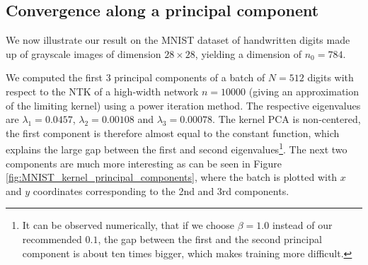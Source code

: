 \documentclass{article}
\begin{document}
\subsection{Convergence along a principal component}
We now illustrate our result on the MNIST dataset of handwritten digits made up of grayscale images of dimension $28 \times 28$, yielding a dimension of $n_0 = 784$.

We computed the first 3 principal components of a batch of $N=512$ digits with respect to the NTK of a high-width network $n=10000$ (giving an approximation of the limiting kernel) using a power iteration method. The respective eigenvalues are $\lambda_1=0.0457$, $\lambda_2=0.00108$ and $\lambda_3=0.00078$. The kernel PCA is non-centered, the first component is therefore almost equal to the constant function, which explains the large gap between the first and second eigenvalues\footnote{It can be observed numerically, that if we choose $\beta=1.0$ instead of our recommended $0.1$, the gap between the first and the second principal component is about ten times bigger, which makes training more difficult.}. The next two components are much more interesting as can be seen in Figure \ref{fig:MNIST_kernel_principal_components}, where the batch is plotted with $x$ and $y$ coordinates corresponding to the 2nd and 3rd components.
\end{document}
